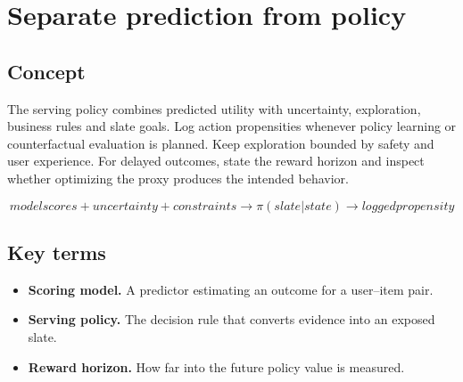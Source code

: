 \section{Separate prediction from policy}

\begin{abstract}
Scores estimate outcomes; the policy decides exposure, exploration and constraints.
\end{abstract}

\subsection{Concept}
The serving policy combines predicted utility with uncertainty, exploration, business rules and slate goals. Log action propensities whenever policy learning or counterfactual evaluation is planned. Keep exploration bounded by safety and user experience. For delayed outcomes, state the reward horizon and inspect whether optimizing the proxy produces the intended behavior.

\begin{equation*}
model scores + uncertainty + constraints \rightarrow π(slate | state) \rightarrow logged propensity
\end{equation*}

\subsection{Key terms}
\begin{itemize}
\item \textbf{Scoring model.} A predictor estimating an outcome for a user–item pair.
\item \textbf{Serving policy.} The decision rule that converts evidence into an exposed slate.
\item \textbf{Reward horizon.} How far into the future policy value is measured.
\end{itemize}
